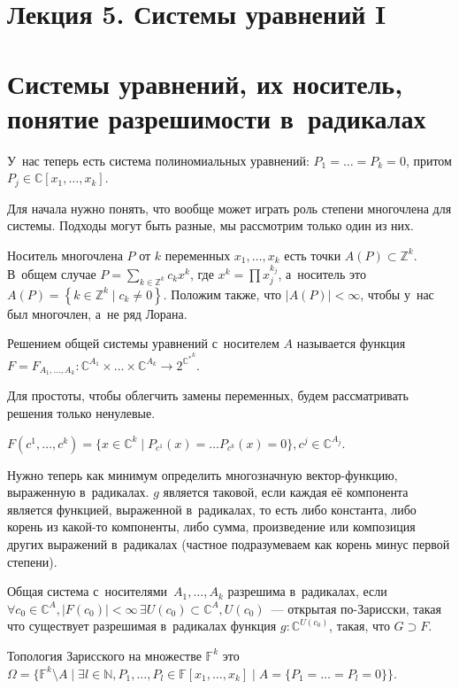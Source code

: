 \documentclass{article}
\begin{document}
\section*{Лекция 5. Системы уравнений I}

\section{Системы уравнений, их носитель, понятие разрешимости в~радикалах}

У~нас теперь есть система полиномиальных уравнений: $P_1 = \ldots = P_k = 0$,
притом $P_j \in \mathbb{C}[x_1, \ldots, x_k]$.

Для начала нужно понять, что вообще может играть роль степени многочлена для
системы. Подходы могут быть разные, мы рассмотрим только один из них.

Носитель многочлена $P$ от $k$ переменных $x_1, \ldots, x_k$ есть точки $A(P)
\subset \mathbb{Z}^k$. В~общем случае $P = \sum_{k \in \mathbb{Z}^k} c_k x^k$,
где $x^k = \prod x_j^{k_j}$, а~носитель это $A(P) = \left\{k \in \mathbb{Z}^k
\mid c_k \ne 0\right\}$. Положим также, что $|A(P)| < \infty$, чтобы у~нас был
многочлен, а~не ряд Лорана.

\begin{definition}
	Решением общей системы уравнений с~носителем $A$ называется функция $F =
	F_{A_1, \ldots, A_k}: \mathbb{C}^{A_1} \times \ldots \times
	{\mathbb{C}}^{A_k} \rightarrow 2^{{\mathbb{C}^\ast}^k}$.

	Для простоты, чтобы облегчить замены переменных, будем рассматривать решения
	только ненулевые.

	$F(c^1, \ldots, c^k) = \{x \in \mathbb{C}^k \mid P_{c^1}(x) = \ldots
	P_{c^k}(x) = 0\}, c^j \in \mathbb{C}^{A_j}$.
\end{definition}

\begin{definition}
	Нужно теперь как минимум определить многозначную вектор-функцию, выраженную
	в~радикалах. $g$ является таковой, если каждая её компонента является функцией,
	выраженной в~радикалах, то есть либо константа, либо корень из какой-то
	компоненты, либо сумма, произведение или композиция других выражений
	в~радикалах (частное подразумеваем как корень минус первой степени).

	Общая система с~носителями~$A_1, \ldots, A_k$ разрешима в~радикалах, если
	$\forall c_0 \in \mathbb{C}^A, |F(c_0)| < \infty\,\exists U(c_0) \subset
	\mathbb{C}^A, U(c_0)$~--- открытая по-Зарисски, такая что
	существует разрешимая в~радикалах функция $g: \mathbb{C}^{U(c_0)}$, такая,
	что $G \supset F$.
\end{definition}

\begin{remark}
	Топология Зарисского на множестве $\mathbb{F}^k$ это $\Omega = \{\mathbb{F}^k
	\setminus A \mid \exists l \in \mathbb{N}, P_1, \ldots, P_l \in
	\mathbb{F}[x_1, \ldots, x_k] \mid A = \{P_1 = \ldots = P_l = 0\}\}$.
\end{remark}
\end{document}
